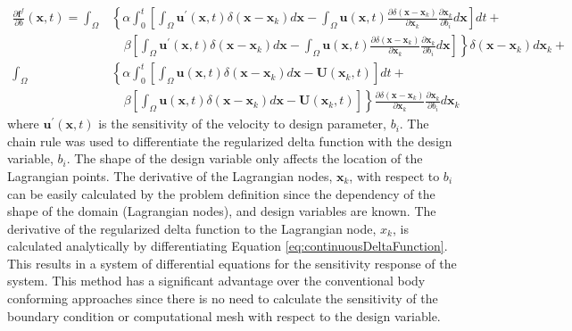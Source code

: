 \documentclass[12pt]{aiaa-pretty}
\begin{document}
\begin{equation}
\begin{aligned}\label{eq:forceingFunctionDerivative}
	\frac{\partial \mathbf{f}^f}{\partial b}(\mathbf{x}, t) = 
	\int_\Omega 
	&\left\{
 	\alpha \int_0^t
	\left[
	\int_\Omega \mathbf{u^\prime} (\mathbf{x}, t) \delta(\mathbf{x} - \mathbf{x}_k) d\mathbf{x} - 
	\int_\Omega \mathbf{u} (\mathbf{x}, t) \frac{\partial \delta(\mathbf{x} - \mathbf{x}_k)}{\partial \mathbf{x}_k} \frac{\partial \mathbf{x}_k}{\partial b_i} d\mathbf{x}
	\right]dt + \right. \\
	&\left.
	\quad \beta
	\left[
	\int_\Omega \mathbf{u^\prime} (\mathbf{x}, t) \delta(\mathbf{x} - \mathbf{x}_k) d\mathbf{x} - 
	\int_\Omega \mathbf{u} (\mathbf{x}, t) \frac{\partial \delta(\mathbf{x} - \mathbf{x}_k)}{\partial \mathbf{x}_k} \frac{\partial \mathbf{x}_k}{\partial b_i} d\mathbf{x}
	\right]
	\right\} \delta(\mathbf{x} - \mathbf{x}_k) d\mathbf{x}_k + \\
	\int_\Omega 
	&\left\{
 	\alpha \int_0^t
	\left[
	\int_\Omega \mathbf{u} (\mathbf{x}, t) \delta(\mathbf{x} - \mathbf{x}_k) d\mathbf{x} - \mathbf{U}\left( \mathbf{x}_k, t \right)
	\right]dt + \right. \\
	&\left.
	\quad \beta \left[
	\int_\Omega \mathbf{u} (\mathbf{x}, t) \delta(\mathbf{x} - \mathbf{x}_k) d\mathbf{x} - \mathbf{U}\left( \mathbf{x}_k, t \right)
	\right]
	\right\} \frac{\partial \delta(\mathbf{x} - \mathbf{x}_k)}{\partial \mathbf{x}_k} \frac{\partial \mathbf{x}_k}{\partial b_i} d\mathbf{x}_k
\end{aligned}
\end{equation}
%
where $\mathbf{u^\prime}\left( \mathbf{x}, t \right)$ is the sensitivity of the velocity to design parameter, $b_i$. The chain rule was used to differentiate the regularized delta function with the design variable, $b_i$. The shape of the design variable only affects the location of the Lagrangian points. The derivative of the Lagrangian nodes, $\mathbf{x}_k$, with respect to $b_i$ can be easily calculated by the problem definition since the dependency of the shape of the domain (Lagrangian nodes), and design variables are known. The derivative of the regularized delta function to the Lagrangian node, $x_k$, is calculated analytically by differentiating Equation \eqref{eq:continuousDeltaFunction}. This results in a system of differential equations for the sensitivity response of the system. This method has a significant advantage over the conventional body conforming approaches since there is no need to calculate the sensitivity of the boundary condition or computational mesh with respect to the design variable.
\end{document}
